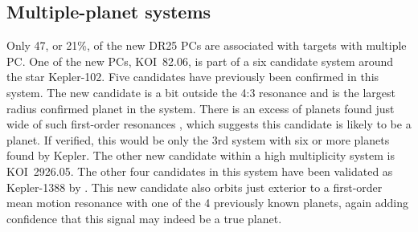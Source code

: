\subsection{Multiple-planet systems}
Only 47, or 21\%, of the new DR25 PCs are associated with targets with multiple PC. One of the new PCs, KOI~82.06, is part of a six candidate system around the star Kepler-102. Five candidates have previously been confirmed \citep{Marcy2014,Rowe2014} in this system. The new candidate is a bit outside the 4:3 resonance and is the largest radius confirmed planet in the system. There is an excess of planets found just wide of such first-order resonances \citep{Lissauer2011}, which suggests this candidate is likely to be a planet. If verified, this would be only the 3rd system with six or more planets found by Kepler. 
The other new candidate within a high multiplicity system is KOI~2926.05. The other four candidates in this system have been validated as Kepler-1388 by \citet{Morton2016}. This new candidate also orbits just exterior to a first-order mean motion resonance with one of the 4 previously known planets, again adding confidence that this signal may indeed be a true planet.

